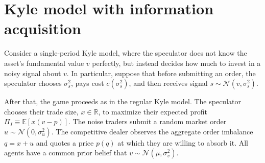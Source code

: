 \documentclass[a4paper]{article}
\newif\ifsolutions
\begin{document}
\ifsolutions
\subsection*{Solution}
	While the specific answer will depend on the specific $\rho, \xi$, and other primitives, we can make a few conjectures.

	Endogenizing the trading opportunities introduces a new negative externality of the FI share $\alpha$ on slow investors when $\alpha < \xi$: higher $\alpha$ now leads to lower $\rho(\alpha)$ for SI. This makes it relatively more appealing to invest in speed, and suggests that the equilibrium share $\alpha^*$ would be higher than with exogenous $\rho$.
	
	Further, for $\alpha > \xi$, SI do not get to trade at all with endogenous $\rho(\alpha)$, and the access of FI to liquidity decreases in $\alpha$, since there would not be enough liquidity for all FI. This introduces a negative externality of $\alpha$ on FI when $\alpha > \xi$, but given that SI have no access to liquidity at all, the effect described in the previous paragraph is likely to dominate.
\fi





\section{Kyle model with information acquisition}

Consider a single-period Kyle model, where the speculator does not know the asset's fundamental value $v$ perfectly, but instead decides how much to invest in a noisy signal about $v$. In particular, suppose that before submitting an order, the speculator chooses $\sigma^2_s$, pays cost $c(\sigma^2_s)$, and then receives signal $s \sim \mathcal{N}(v, \sigma^2_s)$. 

After that, the game proceeds as in the regular Kyle model. The speculator chooses their trade size, $x \in \mathbb{R}$, to maximize their expected profit $\Pi_I \equiv \mathbb{E} [x(v-p)]$. The noise traders submit a random market order $u \sim \mathcal{N}(0,\sigma^2_u)$. The competitive dealer observes the aggregate order imbalance $q=x+u$ and quotes a price $p(q)$ at which they are willing to absorb it. All agents have a common prior belief that $v \sim \mathcal{N}(\mu, \sigma^2_v)$.
\end{document}
